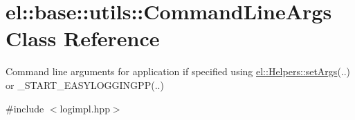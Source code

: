 \hypertarget{classel_1_1base_1_1utils_1_1CommandLineArgs}{\section{el\-:\-:base\-:\-:utils\-:\-:Command\-Line\-Args Class Reference}
\label{classel_1_1base_1_1utils_1_1CommandLineArgs}
}


Command line arguments for application if specified using \hyperlink{classel_1_1Helpers_a68748f618a0c2840b96dc12532b09bf0}{el\-::\-Helpers\-::set\-Args}(..) or \-\_\-\-S\-T\-A\-R\-T\-\_\-\-E\-A\-S\-Y\-L\-O\-G\-G\-I\-N\-G\-P\-P(..)  




{\ttfamily \#include $<$logimpl.\-hpp$>$}

